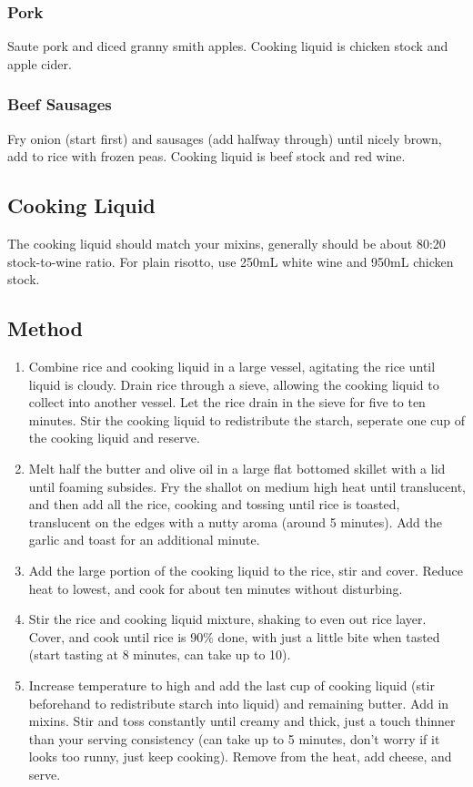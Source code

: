 \begin{multicols}{2}
    \subsubsection{Pork}
      Saute pork and diced granny smith apples. Cooking liquid is chicken stock and apple cider.
    \subsubsection{Beef Sausages}
      Fry onion (start first) and sausages (add halfway through) until nicely brown, add to rice with frozen peas. Cooking liquid is beef stock and red wine.
  \vfill\null
  \columnbreak
  \subsection{Cooking Liquid}
  The cooking liquid should match your mixins, generally should be about 80:20 stock-to-wine ratio. For plain risotto, use 250mL white wine and 950mL chicken stock.

  \subsection{Method}
    \begin{enumerate}
      \item Combine rice and cooking liquid in a large vessel, agitating the rice until liquid is cloudy. Drain rice through a sieve, allowing the cooking liquid to collect into another vessel. Let the rice drain in the sieve for five to ten minutes. Stir the cooking liquid to redistribute the starch, seperate one cup of the cooking liquid and reserve.
      \item Melt half the butter and olive oil in a large flat bottomed skillet with a lid until foaming subsides. Fry the shallot on medium high heat until translucent, and then add all the rice, cooking and tossing until rice is toasted, translucent on the edges with a nutty aroma (around 5 minutes). Add the garlic and toast for an additional minute.
      \item Add the large portion of the cooking liquid to the rice, stir and cover. Reduce heat to lowest, and cook for about ten minutes without disturbing.
      \item Stir the rice and cooking liquid mixture, shaking to even out rice layer. Cover, and cook until rice is 90\% done, with just a little bite when tasted (start tasting at 8 minutes, can take up to 10).
      \item Increase temperature to high and add the last cup of cooking liquid (stir beforehand to redistribute starch into liquid) and remaining butter. Add in mixins. Stir and toss constantly until creamy and thick, just a touch thinner than your serving consistency (can take up to 5 minutes, don’t worry if it looks too runny, just keep cooking). Remove from the heat, add cheese, and serve.
    \end{enumerate}
  \end{multicols}
